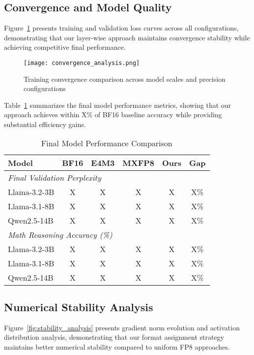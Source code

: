 \documentclass[conference]{IEEEtran}
\begin{document}
\subsection{Convergence and Model Quality}

Figure~\ref{fig:convergence_analysis} presents training and validation loss curves across all configurations, demonstrating that our layer-wise approach maintains convergence stability while achieving competitive final performance.

\begin{figure}[htbp]
    \centering
    \texttt{[image: convergence\_analysis.png]}
    \caption{Training convergence comparison across model scales and precision configurations}
    \label{fig:convergence_analysis}
\end{figure}

Table~\ref{tab:final_performance} summarizes the final model performance metrics, showing that our approach achieves within X\% of BF16 baseline accuracy while providing substantial efficiency gains.

\begin{table}[htbp]
\centering
\caption{Final Model Performance Comparison}
\begin{tabular}{@{}lccccc@{}}
\toprule
\textbf{Model} & \textbf{BF16} & \textbf{E4M3} & \textbf{MXFP8} & \textbf{Ours} & \textbf{Gap} \\
\midrule
\multicolumn{6}{l}{\textit{Final Validation Perplexity}} \\
Llama-3.2-3B & X & X & X & X & X\% \\
Llama-3.1-8B & X & X & X & X & X\% \\
Qwen2.5-14B & X & X & X & X & X\% \\
\midrule
\multicolumn{6}{l}{\textit{Math Reasoning Accuracy (\%)}} \\
Llama-3.2-3B & X & X & X & X & X\% \\
Llama-3.1-8B & X & X & X & X & X\% \\
Qwen2.5-14B & X & X & X & X & X\% \\
\bottomrule
\end{tabular}
\label{tab:final_performance}
\end{table}

\subsection{Numerical Stability Analysis}

Figure~\ref{fig:stability_analysis} presents gradient norm evolution and activation distribution analysis, demonstrating that our format assignment strategy maintains better numerical stability compared to uniform FP8 approaches.
\end{document}
